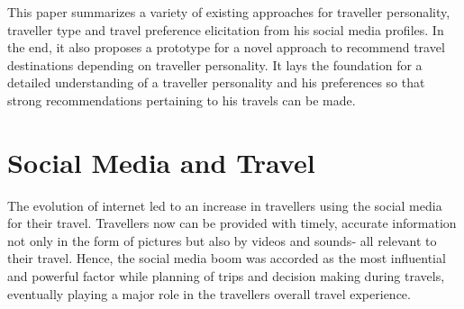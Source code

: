 
This paper summarizes a variety of existing approaches for traveller personality, traveller type and travel preference elicitation from his social media profiles. In the end, it also proposes a prototype for a novel approach to recommend travel destinations depending on traveller personality. It lays the foundation for a detailed understanding of a traveller personality and his preferences so that strong recommendations pertaining to his travels can be made. 








\section{Social Media and Travel}\label{1}

The evolution of internet led to an increase in travellers using the social media for their travel. Travellers now can be provided with timely, accurate information not only in the form of pictures but also by videos and sounds- all relevant to their travel. Hence, the social media boom was accorded as the most influential and powerful factor while planning of trips and decision making during travels, eventually playing a major role in the traveller\textquotesingle s overall travel experience.

